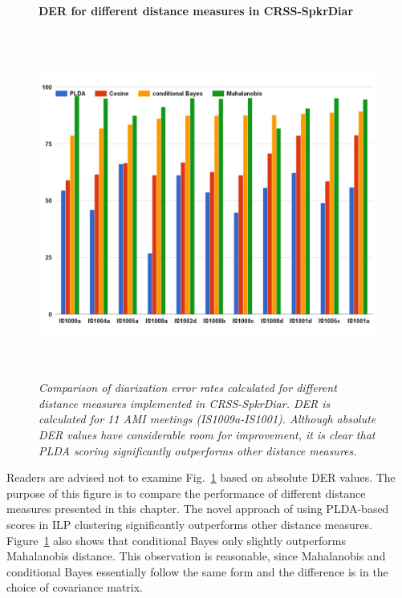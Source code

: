 \begin{figure}[h!]
	\vspace{2mm}
	\centering
	\textbf{DER for different distance measures in CRSS-SpkrDiar}\par\medskip
	\includegraphics[height = 4.5in, width=1\textwidth]{figures/crssdiar_distances_der}
	\caption{\it \small Comparison of diarization error rates calculated for different distance measures implemented in CRSS-SpkrDiar. DER is calculated for 11 AMI meetings (IS1009a-IS1001). Although absolute DER values have considerable room for improvement, it is clear that PLDA scoring significantly outperforms other distance measures.}
	\label{fig:compare_crssdiar_distances}
\end{figure}

Readers are advised not to examine Fig.~\ref{fig:compare_crssdiar_distances} based on absolute DER values. 
The purpose of this figure is to compare the performance of different distance measures presented in this chapter. 
The novel approach of using PLDA-based scores in ILP clustering significantly outperforms other distance measures. 
Figure~\ref{fig:compare_crssdiar_distances} also shows that conditional Bayes only slightly outperforms Mahalanobis distance. 
This observation is reasonable, since Mahalanobis and conditional Bayes essentially follow the same form and the difference is in the choice of covariance matrix. 

